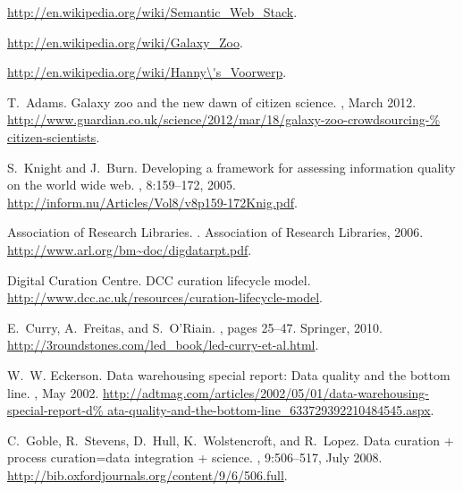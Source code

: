 \documentclass{acm_proc_article-sp}
\begin{document}
\begin{thebibliography}{10}

\url{http://en.wikipedia.org/wiki/Semantic_Web_Stack}.

\url{http://en.wikipedia.org/wiki/Galaxy_Zoo}.

\url{http://en.wikipedia.org/wiki/Hanny\'s_Voorwerp}.

T.~Adams.
\newblock Galaxy zoo and the new dawn of citizen science.
, March 2012.
\newblock
  \url{http://www.guardian.co.uk/science/2012/mar/18/galaxy-zoo-crowdsourcing-%
citizen-scientists}.

S.~Knight and J.~Burn.
\newblock Developing a framework for assessing information quality on the world
  wide web.
, 8:159--172, 2005.
\newblock \url{http://inform.nu/Articles/Vol8/v8p159-172Knig.pdf}.

Association of Research Libraries.
. Association of Research Libraries, 2006.
\newblock \url{http://www.arl.org/bm~doc/digdatarpt.pdf}.

Digital Curation Centre.
\newblock DCC curation lifecycle model.
\newblock \url{http://www.dcc.ac.uk/resources/curation-lifecycle-model}.

E.~Curry, A.~Freitas, and S.~O'Riain.
,
  pages 25--47.
\newblock Springer, 2010.
\newblock \url{http://3roundstones.com/led_book/led-curry-et-al.html}.

W.~W. Eckerson.
\newblock Data warehousing special report: Data quality and the bottom line.
, May 2002.
\newblock
  \url{http://adtmag.com/articles/2002/05/01/data-warehousing-special-report-d%
ata-quality-and-the-bottom-line_633729392210484545.aspx}.

C.~Goble, R.~Stevens, D.~Hull, K.~Wolstencroft, and R.~Lopez.
\newblock Data curation + process curation=data integration + science.
, 9:506--517, July 2008.
\newblock \url{http://bib.oxfordjournals.org/content/9/6/506.full}.


\end{thebibliography}
\end{document}
